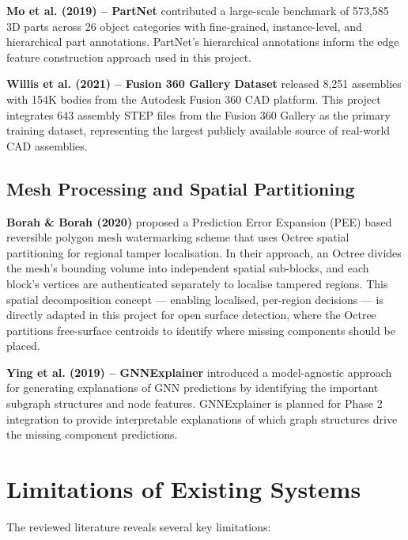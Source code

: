 \documentclass[12pt]{report}
\begin{document}
\textbf{Mo et al. (2019) -- PartNet} contributed a large-scale benchmark of 573,585 3D parts across 26 object categories with fine-grained, instance-level, and hierarchical part annotations. PartNet's hierarchical annotations inform the edge feature construction approach used in this project.

\textbf{Willis et al. (2021) -- Fusion 360 Gallery Dataset} released 8,251 assemblies with 154K bodies from the Autodesk Fusion 360 CAD platform. This project integrates 643 assembly STEP files from the Fusion 360 Gallery as the primary training dataset, representing the largest publicly available source of real-world CAD assemblies.

\subsection{Mesh Processing and Spatial Partitioning}

\textbf{Borah \& Borah (2020)} proposed a Prediction Error Expansion (PEE) based reversible polygon mesh watermarking scheme that uses Octree spatial partitioning for regional tamper localisation. In their approach, an Octree divides the mesh's bounding volume into independent spatial sub-blocks, and each block's vertices are authenticated separately to localise tampered regions. This spatial decomposition concept --- enabling localised, per-region decisions --- is directly adapted in this project for open surface detection, where the Octree partitions free-surface centroids to identify where missing components should be placed.

\textbf{Ying et al. (2019) -- GNNExplainer} introduced a model-agnostic approach for generating explanations of GNN predictions by identifying the important subgraph structures and node features. GNNExplainer is planned for Phase 2 integration to provide interpretable explanations of which graph structures drive the missing component predictions.

\section{Limitations of Existing Systems}

The reviewed literature reveals several key limitations:
\end{document}
